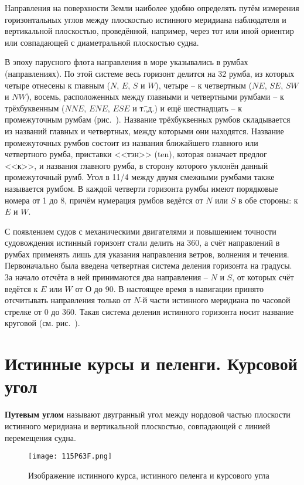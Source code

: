 Направления на поверхности Земли наиболее удобно определять путём
измерения горизонтальных углов между плоскостью истинного меридиана
наблюдателя и вертикальной плоскостью, проведённой, например, через
тот или иной ориентир или совпадающей с диаметральной плоскостью
судна.

В эпоху парусного флота направления в море указывались в румбах
(направлениях). По этой системе весь горизонт делится на 32 румба, из
которых четыре отнесены к главным ($N$, $E$, $S$ и $W$), четыре \--- к
четвертным ($NE$, $SE$, $SW$ и $NW$), восемь, расположенных между
главными и четвертными румбами \--- к трёхбуквенным ($NNE$, $ENE$,
$ESE$ и т.\=,д.) и ещё шестнадцать \--- к промежуточным румбам
(рис.~). Название трёхбуквенных румбов складывается из
названий главных и четвертных, между которыми они находятся. Название
промежуточных румбов состоит из названия ближайшего главного или
четвертного румба, приставки <<тэн>> (ten), которая означает предлог
<<к>>, и названия главного румба, в сторону которого уклонён данный
промежуточный румб. Угол в 11/4 между двумя смежными румбами
также называется румбом. В каждой четверти горизонта румбы имеют
порядковые номера от 1 до 8, причём нумерация румбов ведётся от $N$
или $S$ в обе стороны: к $E$ и $W$.

С появлением судов с механическими двигателями и повышением точности
судовождения истинный горизонт стали делить на 360\gr, а счёт
направлений в румбах применять лишь для указания направления ветров,
волнения и течения. Первоначально была введена четвертная система
деления горизонта на градусы. За начало отсчёта в ней принимаются два
направления \--- $N$ и $S$, от которых счёт ведётся к $E$ или $W$ от О
до 90\gr. В настоящее время в навигации принято отсчитывать
направления только от $N$-й части истинного меридиана по часовой
стрелке от 0 до 360\gr. Такая система деления истинного горизонта
носит название круговой (см. рис.~).

\section{Истинные курсы и пеленги. Курсовой угол} 

\textbf{Путевым углом} называют двугранный угол
между нордовой частью плоскости истинного меридиана и вертикальной
плоскостью, совпадающей с линией перемещения судна.

\begin{wrapfigure}{O}{0.5\textwidth}
  \centering{}
  \texttt{[image: 115P63F.png]} %
  \caption{Изображение истинного курса, истинного пеленга и курсового угла}
  \label{fig:N8}
\end{wrapfigure}

